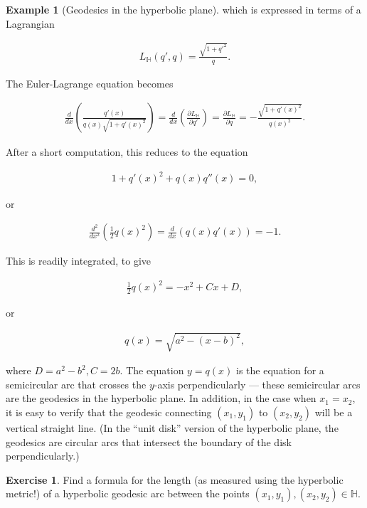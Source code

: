 \documentclass[11pt]{report}
\theoremstyle{plain}
\theoremstyle{definition}
\newtheorem{example}[thm]{Example}
\newtheorem{xexercise}[thm]{Exercise}
\begin{document}
\begin{example}[Geodesics in the hyperbolic plane]
\noindent which is expressed in terms of a Lagrangian

\begin{align*}
L_{\mathbb{H}}(q',q) = \frac{\sqrt{1+q'^2}}{q}.
\end{align*}

\noindent The Euler-Lagrange equation becomes

\begin{align*}
\frac{d}{dx}\left(\frac{q'(x)}{q(x)\sqrt{1+q'(x)^2}}\right)=
\frac{d}{dx}\left(\frac{\partial L_{\mathbb{H}}}{\partial q'} \right) = \frac{\partial L_{\mathbb{H}}}{\partial q} = -\frac{\sqrt{1+q'(x)^2}}{q(x)^2}.
\end{align*}

\noindent After a short computation, this reduces to the
equation

\begin{align*}
1+q'(x)^2+q(x)q''(x) = 0,
\end{align*}

\noindent or

\begin{align*}
\frac{d^2}{dx^2}\left(\tfrac12 q(x)^2\right)
= \frac{d}{dx}\left(q(x) q'(x)\right) = -1.
\end{align*}

\noindent This is readily integrated, to give

\begin{align*}
\tfrac12 q(x)^2 = -x^2 + Cx + D,
\end{align*}

\noindent or

\begin{align*}
q(x) = \sqrt{a^2 - (x-b)^2},
\end{align*}

\noindent where $D=a^2-b^2, C=2b$. The equation $y=q(x)$ is the
equation for a semicircular arc that crosses the
$y$-axis perpendicularly --- these semicircular arcs
are the geodesics in the hyperbolic plane. In
addition, in the case when $x_1=x_2$, it is easy to
verify that the geodesic connecting $(x_1,y_1)$ to
$(x_2,y_2)$ will be a vertical straight line. (In the
``unit disk'' version of the hyperbolic plane, the
geodesics are circular arcs that intersect the
boundary of the disk perpendicularly.)
\end{example}

\begin{xexercise}
Find a formula for the length (as measured using the
hyperbolic metric!) of a hyperbolic geodesic arc
between the points
$(x_1,y_1), (x_2,y_2)\in \mathbb{H}$.
\end{xexercise}
\end{document}

